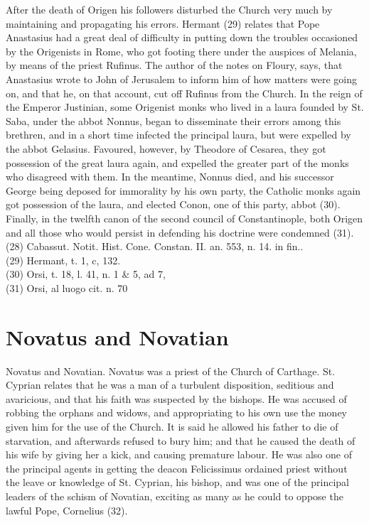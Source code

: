 \documentclass[12pt]{book}
\begin{document}
After the death of Origen his followers disturbed the Church very much by maintaining and propagating
his errors. Hermant (29) relates that Pope Anastasius had a great deal of difficulty in putting down the
troubles occasioned by the Origenists in Rome, who got footing there under the auspices of Melania, by
means of the priest Rufinus. The author of the notes on Floury, says, that Anastasius wrote to John of
Jerusalem to inform him of how matters were going on, and that he, on that account, cut off Rufinus from
the Church. In the reign of the Emperor Justinian, some Origenist monks who lived in a laura founded by
St. Saba, under the abbot Nonnus, began to disseminate their errors among this brethren, and in a short
time infected the principal laura, but were expelled by the abbot Gelasius. Favoured, however, by
Theodore of Cesarea, they got possession of the great laura again, and expelled the greater part of the
monks who disagreed with them. In the meantime, Nonnus died, and his successor George being
deposed for immorality by his own party, the Catholic monks again got possession of the laura, and
elected Conon, one of this party, abbot (30). Finally, in the twelfth canon of the second council of
Constantinople, both Origen and all those who would persist in defending his doctrine were condemned
(31).\\
(28) Cabassut. Notit. Hist. Cone. Constan. II. an. 553, n. 14. in fin.. \\
(29) Hermant, t. 1, c, 132. \\
(30) Orsi, t. 18, l. 41, n. 1 \& 5, ad 7,\\
(31) Orsi, al luogo cit. n. 70
\section{Novatus and Novatian}
Novatus and Novatian. Novatus was a priest of the Church of Carthage. St. Cyprian relates that he was
a man of a turbulent disposition, seditious and avaricious, and that his faith was suspected by the
bishops. He was accused of robbing the orphans and widows, and appropriating to his own use the
money given him for the use of the Church. It is said he allowed his father to die of starvation, and
afterwards refused to bury him; and that he caused the death of his wife by giving her a kick, and causing
premature labour. He was also one of the principal agents in getting the deacon Felicissimus ordained
priest without the leave or knowledge of St. Cyprian, his bishop, and was one of the principal leaders of
the schism of Novatian, exciting as many as he could to oppose the lawful Pope, Cornelius (32).
\end{document}
